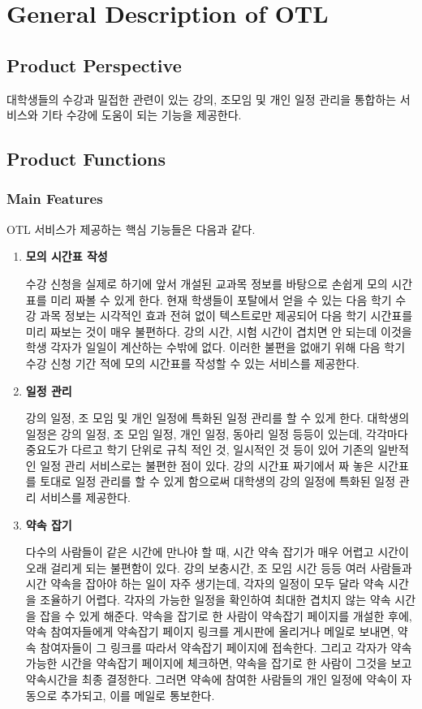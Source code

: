 \documentclass[a4paper,titlepage]{article}
\begin{document}
\pagebreak
\section{General Description of OTL}
\subsection{Product Perspective}

대학생들의 수강과 밀접한 관련이 있는 강의, 조모임 및 개인 일정 관리을 통합하는 서비스와 기타 수강에 도움이 되는 기능을 제공한다.

\subsection{Product Functions}
\subsubsection{Main Features}
OTL 서비스가 제공하는 핵심 기능들은 다음과 같다.
\begin{enumerate}
	\item\textbf{모의 시간표 작성}

	수강 신청을 실제로 하기에 앞서 개설된 교과목 정보를 바탕으로 손쉽게 모의 시간표를 미리 짜볼 수 있게 한다.
	현재 학생들이 포탈에서 얻을 수 있는 다음 학기 수강 과목 정보는 시각적인 효과 전혀 없이 텍스트로만 제공되어 다음 학기 시간표를 미리 짜보는 것이 매우 불편하다.
	강의 시간, 시험 시간이 겹치면 안 되는데 이것을 학생 각자가 일일이 계산하는 수밖에 없다.
	이러한 불편을 없애기 위해 다음 학기 수강 신청 기간 적에 모의 시간표를 작성할 수 있는 서비스를 제공한다.

	\item\textbf{일정 관리}

	강의 일정, 조 모임 및 개인 일정에 특화된 일정 관리를 할 수 있게 한다.
	대학생의 일정은 강의 일정, 조 모임 일정, 개인 일정, 동아리 일정 등등이 있는데, 각각마다 중요도가 다르고 학기 단위로 규칙 적인 것, 일시적인 것 등이 있어 기존의 일반적인 일정 관리 서비스로는 불편한 점이 있다.
	강의 시간표 짜기에서 짜 놓은 시간표를 토대로 일정 관리를 할 수 있게 함으로써 대학생의 강의 일정에 특화된 일정 관리 서비스를 제공한다. 

	\item\textbf{약속 잡기}

	다수의 사람들이 같은 시간에 만나야 할 때, 시간 약속 잡기가 매우 어렵고 시간이 오래 걸리게 되는 불편함이 있다.
	강의 보충시간, 조 모임 시간 등등 여러 사람들과 시간 약속을 잡아야 하는 일이 자주 생기는데, 각자의 일정이 모두 달라 약속 시간을 조율하기 어렵다.
	각자의 가능한 일정을 확인하여 최대한 겹치지 않는 약속 시간을 잡을 수 있게 해준다. 
	약속을 잡기로 한 사람이 약속잡기 페이지를 개설한 후에, 약속 참여자들에게 약속잡기 페이지 링크를 게시판에 올리거나 메일로 보내면, 약속 참여자들이 그 링크를 따라서 약속잡기 페이지에 접속한다.
	그리고 각자가 약속 가능한 시간을 약속잡기 페이지에 체크하면, 약속을 잡기로 한 사람이 그것을 보고 약속시간을 최종 결정한다. 그러면 약속에 참여한 사람들의 개인 일정에 약속이 자동으로 추가되고, 이를 메일로 통보한다.

\end{enumerate}
\end{document}
